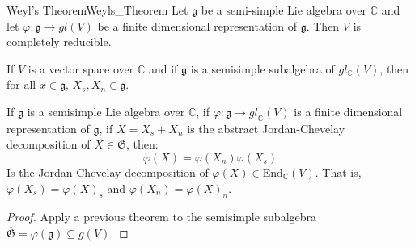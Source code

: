 \documentclass[crop=false,class=article]{standalone}                           %
\begin{document}
        \begin{ltheorem}{Weyl's Theorem}{Weyls_Theorem}
            Let $\mathfrak{g}$ be a semi-simple Lie algebra over $\mathbb{C}$
            and let $\varphi:\mathfrak{g}\rightarrow{gl}(V)$ be a finite
            dimensional representation of $\mathfrak{g}$. Then $V$ is
            completely reducible.
        \end{ltheorem}
        \begin{theorem}
            If $V$ is a vector space over $\mathbb{C}$ and if $\mathfrak{g}$ is
            a semisimple subalgebra of $gl_{\mathbb{C}}(V)$, then for all
            $x\in\mathfrak{g}$, $X_{s},X_{n}\in\mathfrak{g}$.
        \end{theorem}
        \begin{theorem}
            If $\mathfrak{g}$ is a semisimple Lie algebra over $\mathbb{C}$,
            if $\varphi:\mathfrak{g}\rightarrow{gl}_{\mathbb{C}}(V)$ is a
            finite dimensional representation of $\mathfrak{g}$, if
            $X=X_{s}+X_{n}$ is the abstract Jordan-Chevelay decomposition of
            $X\in\mathfrak{G}$, then:
            \begin{equation}
                \varphi(X)=\varphi(X_{n})\varphi(X_{s})
            \end{equation}
            Is the Jordan-Chevelay decomposition of
            $\varphi(X)\in\textrm{End}_{\mathbb{C}}(V)$. That is,
            $\varphi(X_{s})=\varphi(X)_{s}$ and $\varphi(X_{n})=\varphi(X)_{n}$.
        \end{theorem}
        \begin{proof}
            Apply a previous theorem to the semisimple subalgebra
            $\overline{\mathfrak{G}}=\varphi(\mathfrak{g})\subseteq{g}(V)$.
        \end{proof}
\end{document}
